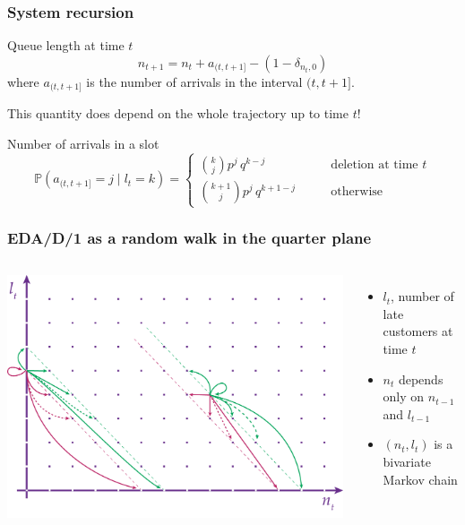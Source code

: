 \documentclass[table,aspectratio=169]{beamer}
\begin{document}
\begin{frame}[t]\frametitle{System recursion}
    \begin{block}{Queue length at time $t$}
        \[n_{t+1}= n_t + a_{(t,t+1]} -(1-\delta_{n_t,0})\]
        where $a_{(t,t+1]}$ is the number of arrivals in the interval $(t,t+1]$.
        \begin{center}
            \alert{This quantity does depend on the whole trajectory up to
            time $t$!}
        \end{center}
    \end{block}
    \vfill
    \begin{alertblock}{Number of arrivals in a slot}
        \[
        \mathbb{P}\left(a_{(t,t+1]}=j \;\Big\vert\; l_t=k \right) =
        \begin{cases}
            {k\choose j} p^j \, q^{k-j} \qquad &\text{deletion at time $t$}\\
            {k+1\choose j} p^j \, q^{k+1-j} \qquad &\text{otherwise}
        \end{cases}
        \]
    \end{alertblock}
\end{frame}

\begin{frame}[t]\frametitle{EDA/D/1 as a random walk in the quarter plane}
    \begin{columns}
        \centering
        \includegraphics[width=\textwidth]{quarterplane}
        \begin{itemize}
            \item $l_t$, number of late customers at time $t$
            \item $n_t$ depends only on $n_{t-1}$ and $l_{t-1}$
            \item $(n_t, l_t)$ is a bivariate Markov chain
        \end{itemize}
    \end{columns}
\end{frame}
\end{document}
